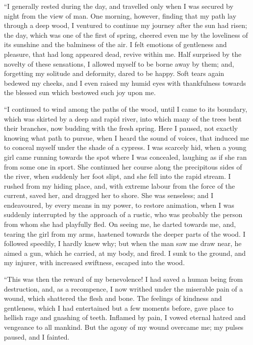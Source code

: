 ``I generally rested during the day,
and travelled only when I was secured
by night from the view of man. One
morning, however, finding that my
path lay through a deep wood, I ventured
to continue my journey after the
sun had risen; the day, which was one
of the first of spring, cheered even me
by the loveliness of its sunshine and
the balminess of the air. I felt emotions
of gentleness and pleasure, that
had long appeared dead, revive within
me. Half surprised by the novelty of
these sensations, I allowed myself to be
borne away by them; and, forgetting
my solitude and deformity, dared to be
happy. Soft tears again bedewed my
cheeks, and I even raised my humid
eyes with thankfulness towards the
blessed sun which bestowed such joy
upon me.

``I continued to wind among the
paths of the wood, until I came to its
boundary, which was skirted by a deep
and rapid river, into which many of the
trees bent their branches, now budding
with the fresh spring. Here I paused,
not exactly knowing what path to pursue,
when I heard the sound of voices,
that induced me to conceal myself under
the shade of a cypress. I was
scarcely hid, when a young girl came
running towards the spot where I was
concealed, laughing as if she ran from
some one in sport. She continued her
course along the precipitous sides of
the river, when suddenly her foot slipt,
and she fell into the rapid stream. I
rushed from my hiding place, and, with
extreme labour from the force of the
current, saved her, and dragged her
to shore. She was senseless; and I endeavoured,
by every means in my
power, to restore animation, when I
was suddenly interrupted by the approach
of a rustic, who was probably
the person from whom she had playfully
fled. On seeing me, he darted
towards me, and, tearing the girl from
my arms, hastened towards the deeper
parts of the wood. I followed speedily,
I hardly knew why; but when the
man saw me draw near, he aimed a
gun, which he carried, at my body, and
fired. I sunk to the ground, and
my injurer, with increased swiftness,
escaped into the wood.

``This was then the reward of my
benevolence! I had saved a human
being from destruction, and, as a recompence,
I now writhed under the
miserable pain of a wound, which
shattered the flesh and bone. The
feelings of kindness and gentleness,
which I had entertained but a few moments
before, gave place to hellish
rage and gnashing of teeth. Inflamed
by pain, I vowed eternal hatred and
vengeance to all mankind. But the
agony of my wound overcame me; my
pulses paused, and I fainted.

